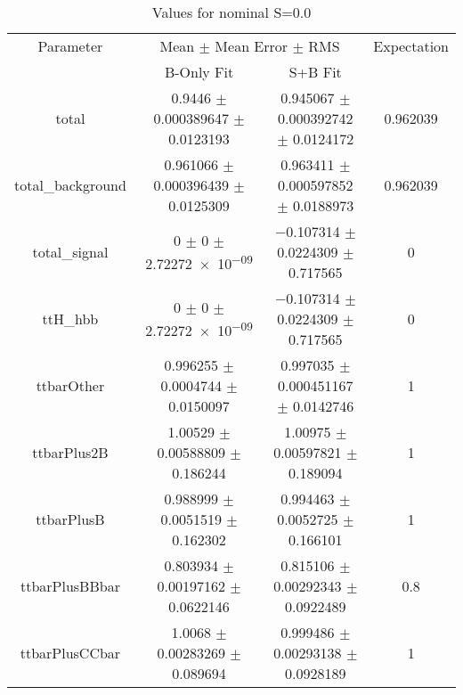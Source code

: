 \begin{table}
\centering
\caption{Values for nominal S=0.0}
\begin{tabular}{cccc}
\toprule
Parameter & \multicolumn{2}{c}{Mean $\pm$ Mean Error $\pm$ RMS} & Expectation\\
 & B-Only Fit & S+B Fit & \\
\midrule
total & \num{0.9446} $\pm$ \num{0.000389647} $\pm$ \num{0.0123193} & \num{0.945067} $\pm$ \num{0.000392742} $\pm$ \num{0.0124172} & \num{0.962039}\\
total\_background & \num{0.961066} $\pm$ \num{0.000396439} $\pm$ \num{0.0125309} & \num{0.963411} $\pm$ \num{0.000597852} $\pm$ \num{0.0188973} & \num{0.962039}\\
total\_signal & \num{0} $\pm$ \num{0} $\pm$ \num{2.72272e-09} & \num{-0.107314} $\pm$ \num{0.0224309} $\pm$ \num{0.717565} & \num{0}\\
ttH\_hbb & \num{0} $\pm$ \num{0} $\pm$ \num{2.72272e-09} & \num{-0.107314} $\pm$ \num{0.0224309} $\pm$ \num{0.717565} & \num{0}\\
ttbarOther & \num{0.996255} $\pm$ \num{0.0004744} $\pm$ \num{0.0150097} & \num{0.997035} $\pm$ \num{0.000451167} $\pm$ \num{0.0142746} & \num{1}\\
ttbarPlus2B & \num{1.00529} $\pm$ \num{0.00588809} $\pm$ \num{0.186244} & \num{1.00975} $\pm$ \num{0.00597821} $\pm$ \num{0.189094} & \num{1}\\
ttbarPlusB & \num{0.988999} $\pm$ \num{0.0051519} $\pm$ \num{0.162302} & \num{0.994463} $\pm$ \num{0.0052725} $\pm$ \num{0.166101} & \num{1}\\
ttbarPlusBBbar & \num{0.803934} $\pm$ \num{0.00197162} $\pm$ \num{0.0622146} & \num{0.815106} $\pm$ \num{0.00292343} $\pm$ \num{0.0922489} & \num{0.8}\\
ttbarPlusCCbar & \num{1.0068} $\pm$ \num{0.00283269} $\pm$ \num{0.089694} & \num{0.999486} $\pm$ \num{0.00293138} $\pm$ \num{0.0928189} & \num{1}\\
\bottomrule
\end{tabular}
\end{table}